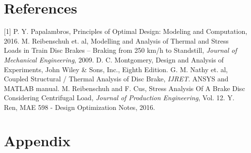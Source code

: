 \documentclass[12pt]{article}
\begin{document}
\section{References}
[1] 	P. Y. Papalambros, Principles of Optimal Design: Modeling and Computation, 2016. \newline\newline
[2] 	M. Reibenschuh et. al, Modelling and Analysis of Thermal and Stress Loads in Train Disc Brakes – Braking from 250 km/h to Standstill, \emph{Journal of Mechanical Engineering}, 2009. \newline\newline
[3] 	D. C. Montgomery, Design and Analysis of Experiments, John Wiley \& Sons, Inc., Eighth Edition. \newline\newline
[4] 	G. M. Nathy et. al, Coupled Structural / Thermal Analysis of Disc Brake, \emph{IJRET}. \newline\newline
[5] 	ANSYS and MATLAB manual. \newline\newline
[6] 	M. Reibenschuh and F. Cus, Stress Analysis Of A Brake Disc Considering Centrifugal Load, \emph{Journal of Production Engineering}, Vol. 12. \newline\newline
[7] 	Y. Ren, MAE 598 - Design Optimization Notes, 2016.
\newpage
\section{Appendix}
\end{document}
